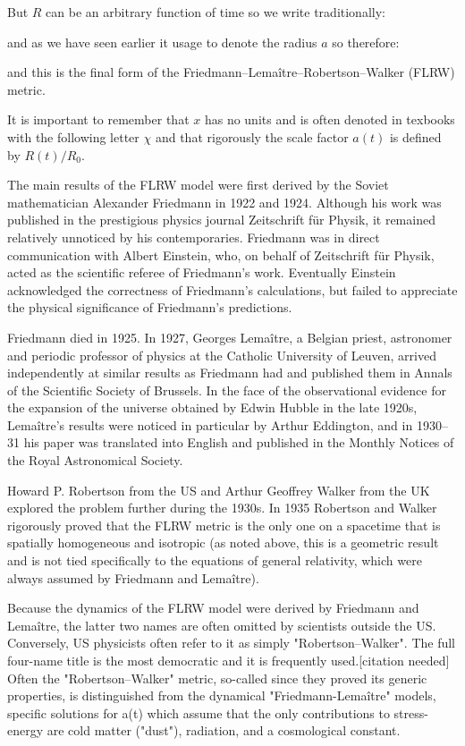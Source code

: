 	But $R$ can be an arbitrary function of time so we write traditionally:
	
	and as we have seen earlier it usage to denote the radius $a$ so therefore:
	
	and this is the final form of the Friedmann–Lemaître–Robertson–Walker (FLRW) metric.
	
	It is important to remember that $x$ has no units and is often denoted in texbooks with the following letter $\chi$ and that rigorously the scale factor $a(t)$ is defined by $R(t)/R_0$.

	The main results of the FLRW model were first derived by the Soviet mathematician Alexander Friedmann in 1922 and 1924. Although his work was published in the prestigious physics journal Zeitschrift für Physik, it remained relatively unnoticed by his contemporaries. Friedmann was in direct communication with Albert Einstein, who, on behalf of Zeitschrift für Physik, acted as the scientific referee of Friedmann's work. Eventually Einstein acknowledged the correctness of Friedmann's calculations, but failed to appreciate the physical significance of Friedmann's predictions.
	
	Friedmann died in 1925. In 1927, Georges Lemaître, a Belgian priest,	astronomer and periodic professor of physics at the Catholic University of Leuven, arrived independently at similar results as Friedmann had and published them in Annals of the Scientific Society of Brussels. In the face of the observational evidence for the expansion of the universe obtained by Edwin Hubble in the late 1920s, Lemaître's results were noticed in particular by Arthur Eddington, and in 1930–31 his paper was translated into English and published in the Monthly Notices of the Royal Astronomical Society.

	Howard P. Robertson from the US and Arthur Geoffrey Walker from the UK explored the problem further during the 1930s. In 1935 Robertson and Walker rigorously proved that the FLRW metric is the only one on a spacetime that is spatially homogeneous and isotropic (as noted above, this is a geometric result and is not tied specifically to the equations of general relativity, which were always assumed by Friedmann and Lemaître).

	Because the dynamics of the FLRW model were derived by Friedmann and Lemaître, the latter two names are often omitted by scientists outside the US. Conversely, US physicists often refer to it as simply "Robertson–Walker". The full four-name title is the most democratic and it is frequently used.[citation needed] Often the "Robertson–Walker" metric, so-called since they proved its generic properties, is distinguished from the dynamical "Friedmann-Lemaître" models, specific solutions for a(t) which assume that the only contributions to stress-energy are cold matter ("dust"), radiation, and a cosmological constant.
	
